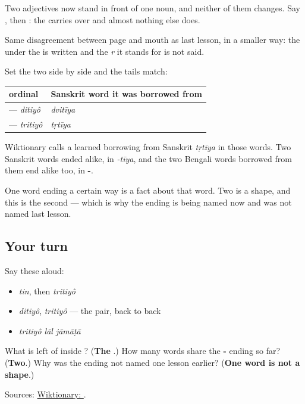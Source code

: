 Two adjectives now stand in front of one noun, and neither of them changes. Say \textbf{}, then \textbf{}: the \textbf{} carries over and almost nothing else does.

Same disagreement between page and mouth as last lesson, in a smaller way: the \textbf{} under the \textbf{} is written and the \emph{r} it stands for is not said.

\begin{grammarlens}[title={What you've built: -\bn{তীয়} is a shape, not a coincidence}]
Set the two side by side and the tails match:

\noindent
\begin{tabularx}{\linewidth}{@{}>{\raggedright\arraybackslash}X>{\raggedright\arraybackslash}X@{}}
\toprule
\textbf{ordinal} & \textbf{Sanskrit word it was borrowed from} \\
\midrule
\textbf{\bn{দ্বিতীয়}} — \emph{ditiyô} & \emph{dvitīya} \\
\textbf{\bn{তৃতীয়}} — \emph{tritiyô} & \emph{tṛtīya} \\
\bottomrule
\end{tabularx}

Wiktionary calls \textbf{} a learned borrowing from Sanskrit \emph{tṛtīya} in those words. Two Sanskrit words ended alike, in \emph{-tīya}, and the two Bengali words borrowed from them end alike too, in \textbf{-}.

One word ending a certain way is a fact about that word. Two is a shape, and this is the second — which is why the ending is being named now and was not named last lesson.
\end{grammarlens}

\subsection*{Your turn}
Say these aloud:

\begin{itemize}
\raggedright
  \item \emph{tin}, then \emph{tritiyô}
  \item \emph{ditiyô}, \emph{tritiyô} — the pair, back to back
  \item \emph{tritiyô lāl jāmāṭā}
\end{itemize}

\begin{tcolorbox}[breakable,colback=teal!4,colframe=teal!35!black,title={Before you move on}]
What is left of \textbf{} inside \textbf{}? (\textbf{The }.) How many words share the \textbf{-} ending so far? (\textbf{Two}.) Why was the ending not named one lesson earlier? (\textbf{One word is not a shape}.)

Sources: \href{https://en.wiktionary.org/wiki/\%E0\%A6\%A4\%E0\%A7\%83\%E0\%A6\%A4\%E0\%A7\%80\%E0\%A7\%9F}{Wiktionary: }.
\end{tcolorbox}
